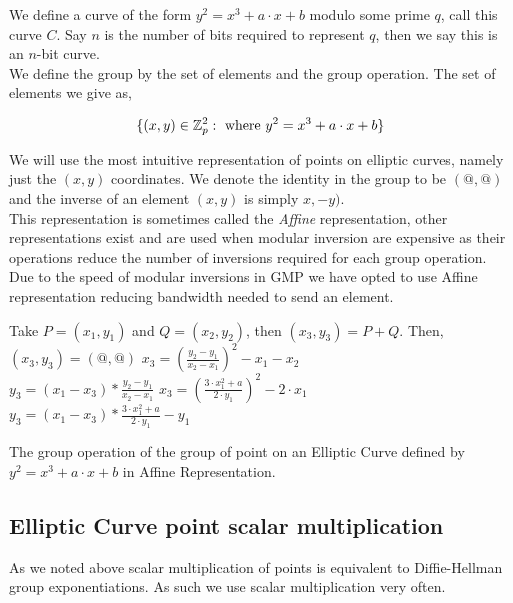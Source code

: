 \documentclass[ %
                    author={Nicholas Tutte},
                supervisor={Prof. Nigel Smart},
                    degree={MEng},
                     title={Secure Two Party Computation},
                  subtitle={A practical comparison of recent protocols},
                      type={Research - GG1K},
                      year={2015} ]{dissertation}
\begin{document}
\begin{appendices}
				We define a curve of the form $y^2 = x^3 + a\cdot x + b$ modulo some prime $q$, call this curve $C$. Say $n$ is the number of bits required to represent $q$, then we say this is an $n$-bit curve.\\

				We define the group by the set of elements and the group operation. The set of elements we give as,

				$$\{(x, y) \in \mathbb{Z}_p^2 : \textnormal{ where } y^2 = x^3 + a\cdot x + b\} $$

				We will use the most intuitive representation of points on elliptic curves, namely just the $(x, y)$ coordinates. We denote the identity in the group to be $(@, @)$ and the inverse of an element $(x, y)$ is simply $x, -y)$.\\

				This representation is sometimes called the \emph{Affine} representation, other representations exist and are used  when modular inversion are expensive as their operations reduce the number of inversions required for each group operation. Due to the speed of modular inversions in GMP we have opted to use Affine representation reducing bandwidth needed to send an element.\\


				\begin{mdframed}
					\begin{algorithm}[H]
						Take $P = (x_1, y_1)$ and $Q = (x_2, y_2)$, then $(x_3, y_3) = P + Q$. Then,\\[0.15cm]
						{
							$(x_3, y_3) = (@, @)$
						}
						{
							{
								$x_3 = (\frac{y_2 - y_1}{x_2 - x_1})^2 - x_1 - x_2$\\
								$y_3 = (x_1 - x_3) * \frac{y_2 - y_1}{x_2 - x_1}$
							}
							{
								$x_3 = (\frac{3\cdot x_1^2 + a}{2 \cdot y_1}) ^ 2 - 2\cdot x_1$\\
								$y_3 = (x_1 - x_3) * \frac{3 \cdot x_1^2 + a}{2 \cdot y_1} - y_1$
							}
						}

						\caption{The group operation of the group of point on an Elliptic Curve defined by $y^2 = x^3 + a \cdot x + b$ in Affine Representation. \label{Algo:ECC_GroupOp}}
					\end{algorithm}
				\end{mdframed}

				\subsection{Elliptic Curve point scalar multiplication}
					As we noted above scalar multiplication of points is equivalent to Diffie-Hellman group exponentiations. As such we use scalar multiplication very often.\\


\end{appendices}
\end{document}
